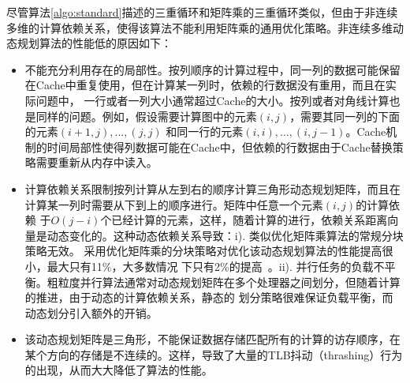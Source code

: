 \begin{flushleft}
尽管算法\ref{algo:standard}描述的三重循环和矩阵乘的三重循环类似，但由于非连续多维的计算依赖关系，使得该算法不能利用矩阵乘的通用优化策略。非连续多维动态规划算法的性能低的原因如下：
\begin{itemize}
	\item 不能充分利用存在的局部性。按列顺序的计算过程中，同一列的数据可能保留在Cache中重复使用，但在计算某一列时，依赖的行数据没有重用，而且在实际问题中，
	一行或者一列大小通常超过Cache的大小。按列或者对角线计算也是同样的问题。例如，假设需要计算图中的元素$(i,j)$，需要其同一列的下面的元素$(i+1,j), ..., (j, j)$
	和同一行的元素$(i,i), ..., (i, j-1)$。Cache机制的时间局部性使得列数据可能在Cache中，但依赖的行数据由于Cache替换策略需要重新从内存中读入。
	\item 计算依赖关系限制按列计算从左到右的顺序计算三角形动态规划矩阵，而且在计算某一列时需要从下到上的顺序进行。矩阵中任意一个元素$(i,j)$的计算依赖
	于$O(j-i)$个已经计算的元素，这样，随着计算的进行，依赖关系距离向量是动态变化的。这种动态依赖关系导致：i). 类似优化矩阵乘算法的常规分块策略无效。
	采用优化矩阵乘的分块策略对优化该动态规划算法的性能提高很小，最大只有11\%，大多数情况
	下只有2\%的提高~\citep{TanThesis2008}。ii).  并行任务的负载不平衡。粗粒度并行算法通常对动态规划矩阵在多个处理器之间划分，但随着计算的推进，由于动态的计算依赖关系，静态的
	划分策略很难保证负载平衡，而动态划分引入额外的开销。
	\item 该动态规划矩阵是三角形，不能保证数据存储匹配所有的计算的访存顺序，在某个方向的存储是不连续的。这样，导致了大量的TLB抖动（thrashing）行为的出现，从而大大降低了算法的性能。
\end{itemize}





\end{flushleft}
